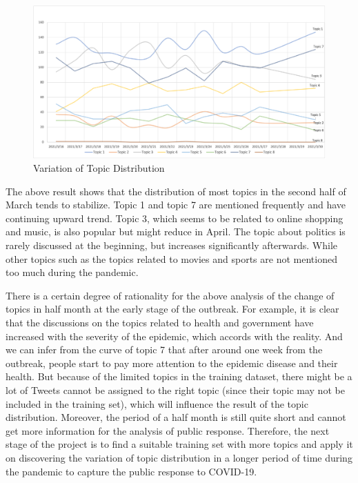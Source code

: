 \begin{figure}[H]
    \centering
    \includegraphics[scale=0.6]{images/topic_distribution.png}
    \caption{Variation of Topic Distribution}
    \label{fig:12}
\end{figure}

The above result shows that the distribution of most topics in the second half of March tends to stabilize. Topic 1 and topic 7 are mentioned frequently and have continuing upward trend. Topic 3, which seems to be related to online shopping and music, is also popular but might reduce in April. The topic about politics is rarely discussed at the beginning, but increases significantly afterwards. While other topics such as the topics related to movies and sports are not mentioned too much during the pandemic. 

There is a certain degree of rationality for the above analysis of the change of topics in half month at the early stage of the outbreak. For example, it is clear that the discussions on the topics related to health and government have increased with the severity of the epidemic, which accords with the reality. And we can infer from the curve of topic 7 that after around one week from the outbreak, people start to pay more attention to the epidemic disease and their health. But because of the limited topics in the training dataset, there might be a lot of Tweets cannot be assigned to the right topic (since their topic may not be included in the training set), which will influence the result of the topic distribution. Moreover, the period of a half month is still quite short and cannot get more information for the analysis of public response. Therefore, the next stage of the project is to find a suitable training set with more topics and apply it on discovering the variation of topic distribution in a longer period of time during the pandemic to capture the public response to COVID-19.